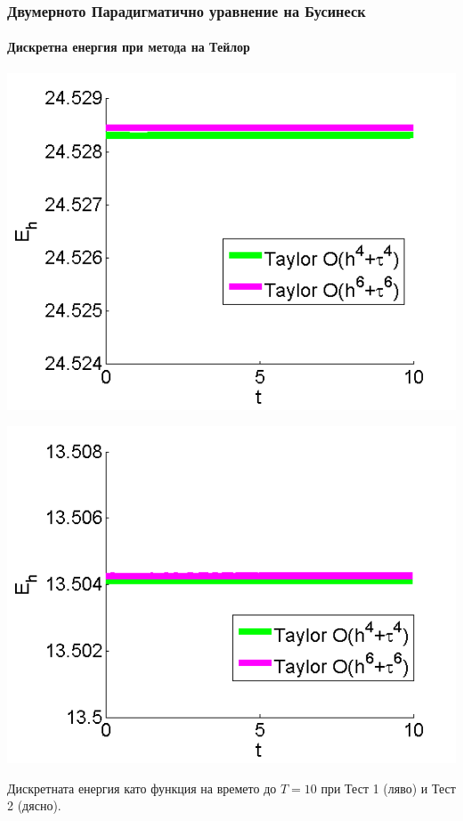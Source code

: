 \documentclass{beamer}
\begin{document}

\begin{frame}
\frametitle{Двумерното Парадигматично уравнение на Бусинеск}
\framesubtitle{Дискретна енергия при метода на Тейлор}

\begin{center}\vspace{0.4cm}
	\begin{minipage}[b]{0.49\linewidth}
		\includegraphics[width=\linewidth]{Energy_bt3_c045_h005_Oh4_Oh6.png}
	\end{minipage}	
	\begin{minipage}[b]{0.49\linewidth}
		\includegraphics[width=\linewidth]{Energy_bt1_c090_h010_Oh4_Oh6.png}
		
	\end{minipage}
\end{center}
Дискретната енергия като функция на времето до $T = 10$ при Тест 1 (ляво) и Тест 2 (дясно).
\end{frame}
\end{document}
